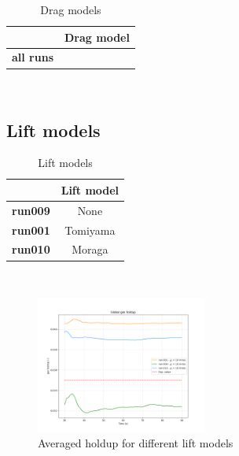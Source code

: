 \documentclass[11pt,a4paper]{article}
\begin{document}
\begin{table}[H]
    \centering 
    \begin{tabular}{|p{8em} c |}
    \hline
    \rowcolor{bluePoli!40}
    & \textbf{Drag model} \T\B \\
    \hline \hline
    \textbf{all runs} &  \T\B \\
    \hline
    \end{tabular}
    \\[10pt]
    \caption{Drag models}
    \label{table:drag_models}
\end{table}

\subsection{Lift models}
\label{sub:lift_models}

\begin{table}[H]
    \centering 
    \begin{tabular}{|p{8em} c |}
    \hline
    \rowcolor{bluePoli!40}
    & \textbf{Lift model} \T\B \\
    \hline \hline
    \textbf{run009} & None \T\B \\
    \textbf{run001} & Tomiyama \T\B \\
    \textbf{run010} & Moraga \T\B \\
    \hline
    \end{tabular}
    \\[10pt]
    \caption{Lift models}
    \label{table:lift_models}
\end{table}

\begin{figure}[H]
    \centering
    \includegraphics[width=0.5\textwidth]{Images/graphs/lift/holdUp10.png}
    \caption{Averaged holdup for different lift models}
    \label{fig:holdup_lift}
\end{figure}
\end{document}
